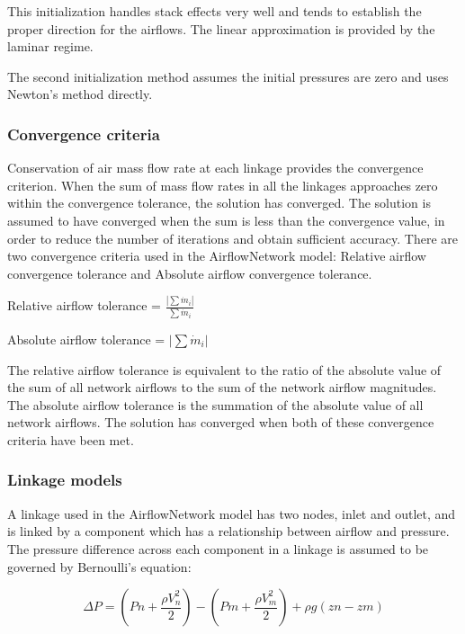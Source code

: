 This initialization handles stack effects very well and tends to establish the proper direction for the airflows. The linear approximation is provided by the laminar regime.

The second initialization method assumes the initial pressures are zero and uses Newton's method directly.

\subsubsection{Convergence criteria}\label{convergence-criteria}

Conservation of air mass flow rate at each linkage provides the convergence criterion. When the sum of mass flow rates in all the linkages approaches zero within the convergence tolerance, the solution has converged. The solution is assumed to have converged when the sum is less than the convergence value, in order to reduce the number of iterations and obtain sufficient accuracy. There are two convergence criteria used in the AirflowNetwork model: Relative airflow convergence tolerance and Absolute airflow convergence tolerance.

Relative airflow tolerance = \(\frac{\left| \sum \dot m_i \right|}{\sum \dot m_i}\)

Absolute airflow tolerance = \(\left| \sum \dot m_i \right|\)

The relative airflow tolerance is equivalent to the ratio of the absolute value of the sum of all network airflows to the sum of the network airflow magnitudes.~ The absolute airflow tolerance is the summation of the absolute value of all network airflows. The solution has converged when both of these convergence criteria have been met.

\subsubsection{Linkage models}\label{linkage-models}

A linkage used in the AirflowNetwork model has two nodes, inlet and outlet, and is linked by a component which has a relationship between airflow and pressure.~ The pressure difference across each component in a linkage is assumed to be governed by Bernoulli's equation:

\begin{equation}
\Delta P = \left( {Pn + \frac{{\rho V_n^2}}{2}} \right) - \left( {Pm + \frac{{\rho V_m^2}}{2}} \right) + \rho g\left( {zn - zm} \right)
\end{equation}

